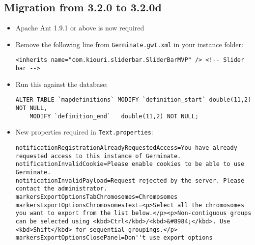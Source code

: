 \subsection{Migration from 3.2.0 to 3.2.0d}
\begin{itemize}
	\item Apache Ant 1.9.1 or above is now required
	\item Remove the following line from \texttt{Germinate.gwt.xml} in your instance folder:
	\begin{lstlisting}[style=Xml]
<inherits name="com.kiouri.sliderbar.SliderBarMVP" /> <!-- Slider bar -->
	\end{lstlisting}
	\item Run this against the database:
	\begin{lstlisting}[style=SQL]
ALTER TABLE `mapdefinitions` MODIFY `definition_start` double(11,2) NOT NULL,
	MODIFY `definition_end`   double(11,2) NOT NULL;
	\end{lstlisting}
	\item New properties required in \texttt{Text.properties}:
	\begin{lstlisting}[style=Properties]
notificationRegistrationAlreadyRequestedAccess=You have already requested access to this instance of Germinate.
notificationInvalidCookie=Please enable cookies to be able to use Germinate.
notificationInvalidPayload=Request rejected by the server. Please contact the administrator.
markersExportOptionsTabChromosomes=Chromosomes
markersExportOptionsChromosomesText=<p>Select all the chromosomes you want to export from the list below.</p><p>Non-contiguous groups can be selected using <kbd>Ctrl</kbd>/<kbd>&#8984;</kbd>. Use <kbd>Shift</kbd> for sequential groupings.</p>
markersExportOptionsClosePanel=Don''t use export options
	\end{lstlisting}
\end{itemize}